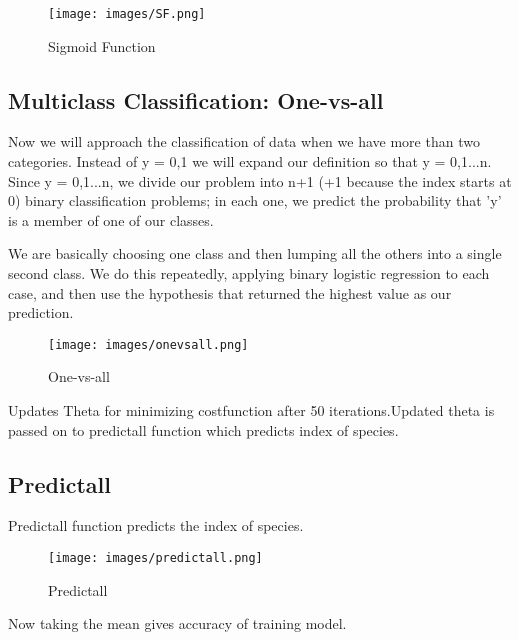 \documentclass[11pt,letterpaper]{article}
\begin{document}
\begin{figure}[h!]
\centering
\label{fig:sigmoid}
\graphicspath{ {images/} }
\texttt{[image: images/SF.png]}
\caption{Sigmoid Function}
\end{figure}
\bigskip
\bigskip
\bigskip


\subsection{Multiclass Classification: One-vs-all}
Now we will approach the classification of data when we have more than two categories. Instead of y = {0,1} we will expand our definition so that y = {0,1...n}.
Since y = {0,1...n}, we divide our problem into n+1 (+1 because the index starts at 0) binary classification problems; in each one, we predict the probability that 'y' is a member of one of our classes.

We are basically choosing one class and then lumping all the others into a single second class. We do this repeatedly, applying binary logistic regression to each case, and then use the hypothesis that returned the highest value as our prediction.


\begin{figure}[h!]
\centering
\label{fig:onevsall}
\graphicspath{ {images/} }
\texttt{[image: images/onevsall.png]}
\caption{One-vs-all}
\end{figure}

Updates Theta for minimizing costfunction after 50 iterations.Updated theta is passed on to predictall function which predicts index of species.

\subsection{Predictall}
Predictall function predicts the index of species.
\begin{figure}[h!]
\centering
\label{fig:predictall}
\graphicspath{ {images/} }
\texttt{[image: images/predictall.png]}
\caption{Predictall}
\end{figure}

Now taking the mean gives accuracy of training model.
\end{document}

